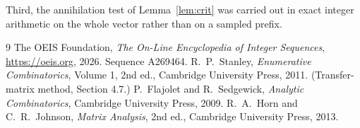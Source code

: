 \documentclass[11pt,a4paper]{article}
\theoremstyle{plain}
\theoremstyle{definition}
\begin{document}
Third, the annihilation test of Lemma~\ref{lem:crit} was carried out in exact integer
arithmetic on the whole vector rather than on a sampled prefix.

\begin{thebibliography}{9}
 The OEIS Foundation, \emph{The On-Line Encyclopedia of Integer
Sequences}, \url{https://oeis.org}, 2026. Sequence A269464.
 R.~P.~Stanley, \emph{Enumerative Combinatorics}, Volume 1, 2nd ed.,
Cambridge University Press, 2011. (Transfer-matrix method, Section 4.7.)
 P.~Flajolet and R.~Sedgewick, \emph{Analytic Combinatorics}, Cambridge
University Press, 2009.
 R.~A.~Horn and C.~R.~Johnson, \emph{Matrix Analysis}, 2nd ed., Cambridge
University Press, 2013.
\end{thebibliography}
\end{document}
